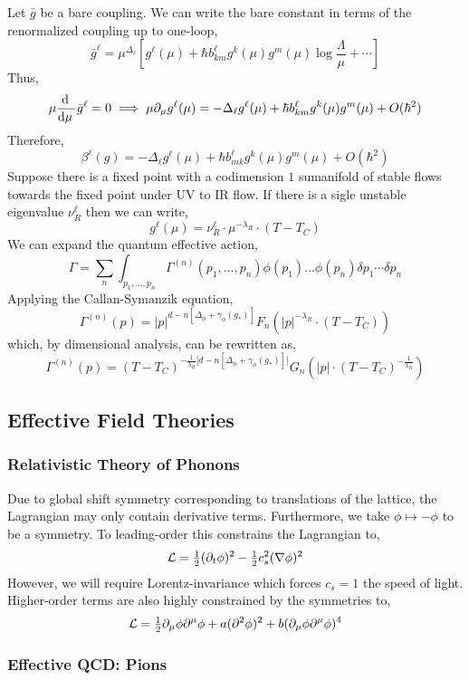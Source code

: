 \documentclass[12pt]{extarticle}
\begin{document}
Let $\bar{g}$ be a bare coupling. We can write the bare constant in terms of the renormalized coupling up to one-loop,
\[ \bar{g}^{\ell} = \mu^{\Delta_{\ell}} \left[ g^{\ell}(\mu) + \hbar b^{\ell}_{km} g^{k}(\mu) g^m(\mu) \log{\frac{\Lambda}{\mu}} + \cdots \right] \]
Thus,
\[ \mu \frac{\mathrm{d} \:}{\mathrm{d}\mu \:} \bar{g}^{\ell} = 0 \implies \mu \partial_\mu g^{\ell}(\mu) = - \Delta_{\ell} g^{\ell}(\mu) + \hbar b^{\ell}_{km} g^k(\mu) g^m(\mu) + O(\hbar^2) \]
Therefore,
\[ \beta^{\ell}(g) = - \Delta_{\ell} g^{\ell}(\mu) + \hbar b^{\ell}_{mk} g^k(\mu) g^m(\mu) + O(\hbar^2) \]
Suppose there is a fixed point with a codimension $1$ sumanifold of stable flows towards the fixed point under UV to IR flow. If there is a sigle unstable eigenvalue $\nu^{\ell}_R$ then we can write,
\[ g^{\ell}(\mu) = \nu^{\ell}_R \cdot \mu^{- \lambda_R} \cdot (T - T_C) \]
We can expand the quantum effective action,
\[ \Gamma = \sum_n \int_{p_1, \dots, p_n} \Gamma^{(n)}(p_1, \dots, p_n) \phi(p_1) \dots \phi(p_n) \delta p_1 \cdots \delta p_n \]
Applying the Callan-Symanzik equation,
\[ \Gamma^{(n)}(p) = |p|^{d - n[\Delta_\phi + \gamma_\phi(g_*)]} F_n(|p|^{- \lambda_R} \cdot (T - T_C)) \]
which, by dimensional analysis, can be rewritten as,
\[ \Gamma^{(n)}(p) = (T - T_C)^{- \frac{1}{\lambda_R} \big[d - n[\Delta_\phi + \gamma_\phi(g_*)] \big]} G_n( |p| \cdot (T - T_C)^{-\frac{1}{\lambda_R}}) \]

\subsection{Effective Field Theories}

\subsubsection{Relativistic Theory of Phonons}

Due to global shift symmetry corresponding to translations of the lattice, the Lagrangian may only contain derivative terms. Furthermore, we take $\phi \mapsto - \phi$ to be a symmetry. To leading-order this constrains the Lagrangian to,
\[ \mathcal{L} = \tfrac{1}{2} (\partial_t \phi)^2 - \tfrac{1}{2} c_s^2 (\nabla \phi)^2  \]
However, we will require Lorentz-invariance which forces $c_s = 1$ the speed of light. Higher-order terms are also highly constrained by the symmetries to,
\[ \mathcal{L} = \tfrac{1}{2} \partial_\mu \phi \partial^\mu \phi + a (\partial^2 \phi)^2 + b (\partial_\mu \phi \partial^\mu \phi)^4 \]

\subsubsection{Effective QCD: Pions}
\end{document}
